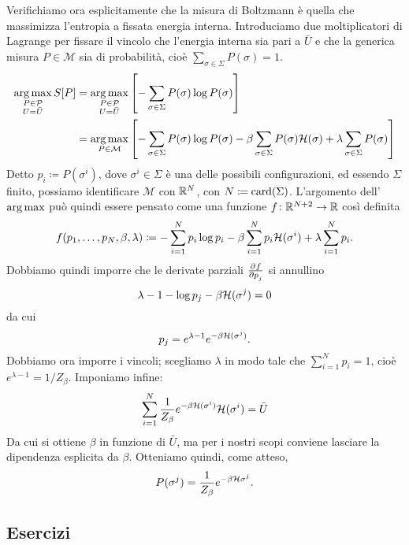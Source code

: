 Verifichiamo ora esplicitamente che la misura di Boltzmann è quella che massimizza l'entropia a fissata energia interna. Introduciamo due moltiplicatori di Lagrange per fissare il vincolo che l'energia interna sia pari a $ \bar{U} $ e che la generica misura $ P\in\mathcal{M} $ sia di probabilità, cioè $ \sum_{\sigma\in\Sigma}P(\sigma) = 1 $.
\begin{align*}
    \operatorname*{arg\, max}_{\substack{P\in\mathcal{P}\\ U=\bar{U}}} S[P] & = \operatorname*{arg\, max}_{\substack{P\in\mathcal{P}\\ U=\bar{U}}} \left[ -\sum_{\sigma\in\Sigma}P(\sigma)\log{P(\sigma)} \right]\\
                                                          & = \operatorname*{arg\, max}_{P\in\mathcal{M}} \left[ -\sum_{\sigma\in\Sigma}P(\sigma)\log{P(\sigma)} - \beta \sum_{\sigma\in\Sigma}P(\sigma)\mathcal{H}(\sigma) + \lambda \sum_{\sigma\in\Sigma}P(\sigma) \right]
\end{align*}
Detto $ p_i \coloneqq P(\sigma^i) $, dove $ \sigma^i \in \Sigma $ è una delle possibili configurazioni, ed essendo $ \Sigma $ finito, possiamo identificare $ \mathcal{M} $ con $ \mathbb{R}^N $, con $ N \coloneqq \operatorname{card}(\Sigma) $. L'argomento dell'$ \operatorname*{arg\, max} $ può quindi essere pensato come una funzione $ f\colon \mathbb{R}^{N+2}\to\mathbb{R} $ così definita
\[ f(p_1, \ldots, p_N, \beta, \lambda) \coloneqq -\sum_{i=1}^N p_i\log{p_i} - \beta \sum_{i=1}^N p_i\mathcal{H}(\sigma^i) + \lambda \sum_{i=1}^N p_i. \]
Dobbiamo quindi imporre che le derivate parziali $ \pd{f}{p_j} $ si annullino
\[ \lambda -1 - \log{p_j} - \beta \mathcal{H}(\sigma^j) = 0 \]
da cui
\[ p_j = e^{\lambda - 1} e^{-\beta\mathcal{H}(\sigma^j)}. \]
Dobbiamo ora imporre i vincoli; scegliamo $ \lambda $ in modo tale che $ \sum_{i=1}^{N} p_i = 1 $, cioè $ {e^{\lambda - 1} = 1/Z_\beta} $. Imponiamo infine:
\[ \sum_{i=1}^{N} \frac{1}{Z_\beta} e^{-\beta\mathcal{H}(\sigma^i)} \mathcal{H}(\sigma^i) = \bar{U} \]
Da cui si ottiene $ \beta $ in funzione di $ \bar{U} $, ma per i nostri scopi conviene lasciare la dipendenza esplicita da $ \beta $. Otteniamo quindi, come atteso,
\[ P(\sigma^j) = \frac{1}{Z_\beta} e^{-\beta\mathcal{H}{\sigma^j}}. \]

\subsection{Esercizi}

